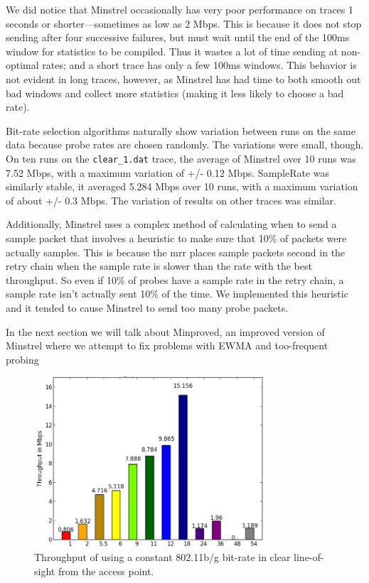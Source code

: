 \documentclass[letterpaper,twocolumn,10pt]{article}
\begin{document}
We did notice that Minstrel occasionally has very poor performance on traces 1 seconds or shorter---sometimes as low as 2 Mbps. This is because it does not stop sending after four successive failures, but must wait until the end of the 100ms window for statistics to be compiled. Thus it wastes a lot of time sending at non-optimal rates; and a short trace has only a few 100ms windows. This behavior is not evident in long traces, however, as Minstrel has had time to both smooth out bad windows and collect more statistics (making it less likely to choose a bad rate).

Bit-rate selection algorithms naturally show variation between runs on the same data because probe rates are chosen randomly. The variations were small, though. On ten runs on the \texttt{clear\_1.dat} trace, the average of Minstrel over 10 runs was 7.52 Mbps, with a maximum variation of +/- 0.12 Mbps. SampleRate was similarly stable, it averaged 5.284 Mbps over 10 runs, with a maximum variation of about +/- 0.3 Mbps. The variation of results on other traces was similar.

Additionally, Minstrel uses a complex method of calculating when to send a sample packet that involves a heuristic to make sure that 10\% of packets were actually samples. This is because the mrr places sample packets second in the retry chain when the sample rate is slower than the rate with the best throughput. So even if 10\% of probes have a sample rate in the retry chain, a sample rate isn't actually sent 10\% of the time. We implemented this heuristic and it tended to cause Minstrel to send too many probe packets.

In the next section we will talk about Minproved, an improved version of Minstrel where we attempt to fix problems with EWMA and too-frequent probing

\begin{figure}[htb]
  \hspace{-1em}\includegraphics[width=3.4in]{constant.png}\vspace{-0em}
  \caption{Throughput of using a constant 802.11b/g bit-rate in clear line-of-sight from the access point.}
\label{figure:2}
\end{figure}
\end{document}
